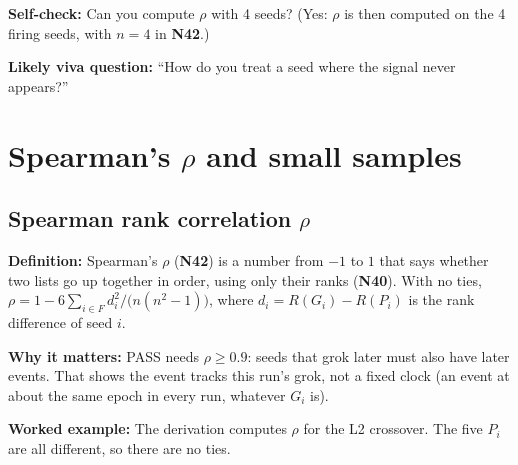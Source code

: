 \documentclass[11pt,a4paper,oneside,openany]{report}
\newcommand{\gl}[1]{\textbf{#1}}   %
\newcommand{\fdef}{\textbf{Definition:} }
\newcommand{\fwhy}{\par\textbf{Why it matters:} }
\newcommand{\fex}{\par\textbf{Worked example:} }
\newcommand{\fself}{\par\textbf{Self-check:} }
\newcommand{\fviva}{\par\textbf{Likely viva question:} }
\begin{document}
\fself Can you compute $\rho$ with 4 seeds? (Yes: $\rho$ is then computed on the 4 firing seeds, with $n = 4$ in \gl{N42}.)
\fviva ``How do you treat a seed where the signal never appears?''

\chapter{Spearman's $\rho$ and small samples}

\section{Spearman rank correlation $\rho$}
\fdef Spearman's $\rho$ (\gl{N42}) is a number from $-1$ to $1$ that says whether two lists go up together in order, using only their ranks (\gl{N40}). With no ties, $\rho = 1 - 6\sum_{i \in F} d_i^2 / \big(n(n^2-1)\big)$, where $d_i = R(G_i) - R(P_i)$ is the rank difference of seed $i$.
\fwhy PASS needs $\rho \ge 0.9$: seeds that grok later must also have later events. That shows the event tracks this run's grok, not a fixed clock (an event at about the same epoch in every run, whatever $G_i$ is).
\fex The derivation computes $\rho$ for the L2 crossover. The five $P_i$ are all different, so there are no ties.
\end{document}

